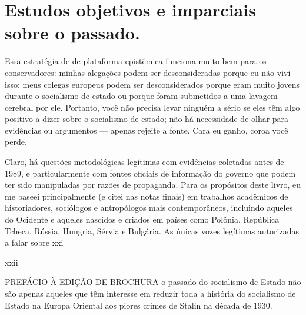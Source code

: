 \section{Estudos objetivos e imparciais sobre o passado.}
 \par 
Essa estratégia de de plataforma epistêmica funciona muito bem para os conservadores: minhas alegações podem ser desconsideradas porque eu não vivi isso; meus colegas europeus podem ser desconsiderados porque eram muito jovens durante o socialismo de estado ou porque foram submetidos a uma lavagem cerebral por ele. Portanto, você não precisa levar ninguém a sério se eles têm algo positivo a dizer sobre o socialismo de estado; não há necessidade de olhar para evidências ou argumentos — apenas rejeite a fonte. Cara eu ganho, coroa você perde.
 \par 
Claro, há questões metodológicas legítimas com evidências coletadas antes de 1989, e particularmente com fontes oficiais de informação do governo que podem ter sido manipuladas por razões de propaganda. Para os propósitos deste livro, eu me baseei principalmente (e citei nas notas finais) em trabalhos acadêmicos de historiadores, sociólogos e antropólogos mais contemporâneos, incluindo aqueles do Ocidente e aqueles nascidos e criados em países como Polônia, República Tcheca, Rússia, Hungria, Sérvia e Bulgária. As únicas vozes legítimas autorizadas a falar sobre xxi
 \par 
xxii
 \par 
PREFÁCIO À EDIÇÃO DE BROCHURA o passado do socialismo de Estado não são apenas aqueles que têm interesse em reduzir toda a história do socialismo de Estado na Europa Oriental aos piores crimes de Stalin na década de 1930.
 \par 

